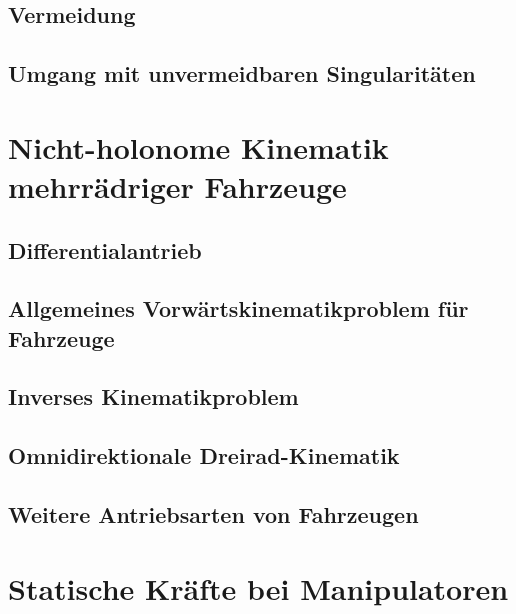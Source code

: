 		\subsection{Vermeidung} %

		\subsection{Umgang mit unvermeidbaren Singularitäten} %

	\section{Nicht-holonome Kinematik mehrrädriger Fahrzeuge} %

		\subsection{Differentialantrieb} %

		\subsection{Allgemeines Vorwärtskinematikproblem für Fahrzeuge} %

		\subsection{Inverses Kinematikproblem} %

		\subsection{Omnidirektionale Dreirad-Kinematik} %

		\subsection{Weitere Antriebsarten von Fahrzeugen} %

	\section{Statische Kräfte bei Manipulatoren} %

